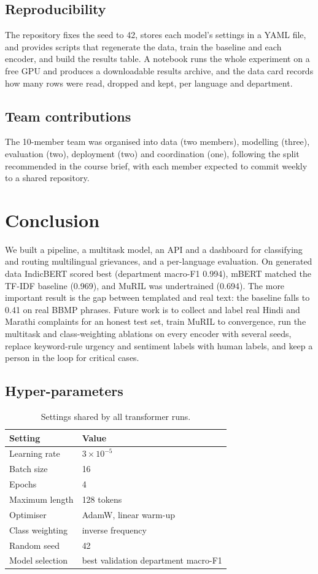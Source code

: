 \documentclass[conference]{IEEEtran}
\begin{document}
\subsection{Reproducibility}
The repository fixes the seed to 42, stores each model's settings in a YAML file, and provides scripts that regenerate the data, train the baseline and each encoder, and build the results table.
A notebook runs the whole experiment on a free GPU and produces a downloadable results archive, and the data card records how many rows were read, dropped and kept, per language and department.
\subsection{Team contributions}
The 10-member team was organised into data (two members), modelling (three), evaluation (two), deployment (two) and coordination (one), following the split recommended in the course brief, with each member expected to commit weekly to a shared repository.

\section{Conclusion}
We built a pipeline, a multitask model, an API and a dashboard for classifying and routing multilingual grievances, and a per-language evaluation. On generated data IndicBERT scored best (department macro-F1 0.994), mBERT matched the TF-IDF baseline (0.969), and MuRIL was undertrained (0.694). The more important result is the gap between templated and real text: the baseline falls to 0.41 on real BBMP phrases. Future work is to collect and label real Hindi and Marathi complaints for an honest test set, train MuRIL to convergence, run the multitask and class-weighting ablations on every encoder with several seeds, replace keyword-rule urgency and sentiment labels with human labels, and keep a person in the loop for critical cases.

\appendix
\subsection{Hyper-parameters}
\begin{table}[h]
\caption{Settings shared by all transformer runs.}
\label{tab:hp}
\centering
\small
\begin{tabular}{@{}ll@{}}
\toprule
Setting & Value \\
\midrule
Learning rate & $3{\times}10^{-5}$ \\
Batch size & 16 \\
Epochs & 4 \\
Maximum length & 128 tokens \\
Optimiser & AdamW, linear warm-up \\
Class weighting & inverse frequency \\
Random seed & 42 \\
Model selection & best validation department macro-F1 \\
\bottomrule
\end{tabular}
\end{table}
\end{document}
